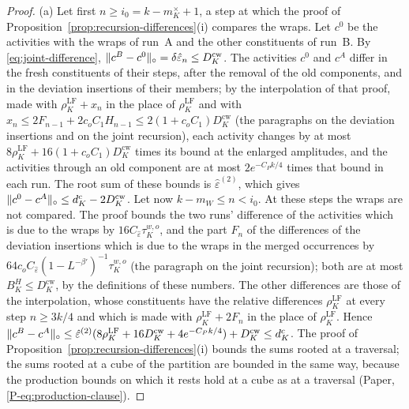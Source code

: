 \documentclass[11pt]{preprint}
\DeclarePairedDelimiter{\norm}{\lVert}{\rVert}
\numberwithin{equation}{section}
\theoremstyle{definition}
\theoremstyle{remark}
\theoremstyle{plain}
\begin{document}
\begin{proof}
(a) Let first $n \geq i_0 = k - m^\times_K + 1$, a step at which the proof of Proposition~\ref{prop:recursion-differences}(i) compares the wraps. Let $c^0$ be the activities with the wraps of run~A and the other constituents of run~B. By \eqref{eq:joint-difference}, $\norm{c^B - c^0}_\circ = \delta\hat\varepsilon_n \leq D^{\mathrm{cw}}_K$. The activities $c^0$ and $c^A$ differ in the fresh constituents of their steps, after the removal of the old components, and in the deviation insertions of their members; by the interpolation of that proof, made with $\rho^{\mathrm{LF}}_K + x_n$ in the place of $\rho^{\mathrm{LF}}_K$ and with $x_n \leq 2F_{n-1} + 2c_oC_1H_{n-1} \leq 2(1 + c_oC_1)D^{\mathrm{cw}}_K$ (the paragraphs on the deviation insertions and on the joint recursion), each activity changes by at most $8\rho^{\mathrm{LF}}_K + 16(1 + c_oC_1)D^{\mathrm{cw}}_K$ times its bound at the enlarged amplitudes, and the activities through an old component are at most $2e^{-C_Pk/4}$ times that bound in each run. The root sum of these bounds is $\hat\varepsilon^{(2)}$, which gives $\norm{c^0 - c^A}_\circ \leq d^c_K - 2D^{\mathrm{cw}}_K$. Let now $k - m_W \leq n < i_0$. At these steps the wraps are not compared. The proof bounds the two runs' difference of the activities which is due to the wraps by $16C_{\hat\varepsilon}\tau^{w,o}_K$, and the part $F_n$ of the differences of the deviation insertions which is due to the wraps in the merged occurrences by $64c_oC_{\hat\varepsilon}(1 - L^{-\beta'})^{-1}\tau^{w,o}_K$ (the paragraph on the joint recursion); both are at most $B^H_K \leq D^{\mathrm{cw}}_K$, by the definitions of these numbers. The other differences are those of the interpolation, whose constituents have the relative differences $\rho^{\mathrm{LF}}_K$ at every step $n \geq 3k/4$ and which is made with $\rho^{\mathrm{LF}}_K + 2F_n$ in the place of $\rho^{\mathrm{LF}}_K$. Hence $\norm{c^B - c^A}_\circ \leq \hat\varepsilon^{(2)}(8\rho^{\mathrm{LF}}_K + 16D^{\mathrm{cw}}_K + 4e^{-C_Pk/4}) + D^{\mathrm{cw}}_K \leq d^c_K$. The proof of Proposition~\ref{prop:recursion-differences}(i) bounds the sums rooted at a traversal; the sums rooted at a cube of the partition are bounded in the same way, because the production bounds on which it rests hold at a cube as at a traversal (Paper, \eqref{P-eq:production-clause}).


\end{proof}
\end{document}
